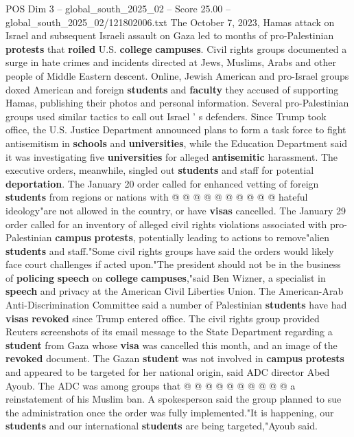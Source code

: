 \begin{textsample}{POS Dim 3 – global\_south\_2025\_02 – Score 25.00 – global\_south\_2025\_02/121802006.txt}
The October 7, 2023, Hamas attack on Israel and subsequent Israeli assault on Gaza led to months of pro-Palestinian \textbf{protests} that \textbf{roiled} U.S. \textbf{college} \textbf{campuses}.
Civil rights groups documented a surge in hate crimes and incidents directed at Jews, Muslims, Arabs and other people of Middle Eastern descent.
Online, Jewish American and pro-Israel groups doxed American and foreign \textbf{students} and \textbf{faculty} they accused of supporting Hamas, publishing their photos and personal information.
Several pro-Palestinian groups used similar tactics to call out Israel ' s defenders.
Since Trump took office, the U.S.
Justice Department announced plans to form a task force to fight antisemitism in \textbf{schools} and \textbf{universities}, while the Education Department said it was investigating five \textbf{universities} for alleged \textbf{antisemitic} harassment.
The executive orders, meanwhile, singled out \textbf{students} and staff for potential \textbf{deportation}.
The January 20 order called for enhanced vetting of foreign \textbf{students} from regions or nations with @ @ @ @ @ @ @ @ @ @ hateful ideology"are not allowed in the country, or have \textbf{visas} cancelled.
The January 29 order called for an inventory of alleged civil rights violations associated with pro-Palestinian \textbf{campus} \textbf{protests}, potentially leading to actions to remove"alien \textbf{students} and staff."Some civil rights groups have said the orders would likely face court challenges if acted upon."The president should not be in the business of \textbf{policing} \textbf{speech} on \textbf{college} \textbf{campuses},"said Ben Wizner, a specialist in \textbf{speech} and privacy at the American Civil Liberties Union.
The American-Arab Anti-Discrimination Committee said a number of Palestinian \textbf{students} have had \textbf{visas} \textbf{revoked} since Trump entered office.
The civil rights group provided Reuters screenshots of its email message to the State Department regarding a \textbf{student} from Gaza whose \textbf{visa} was cancelled this month, and an image of the \textbf{revoked} document.
The Gazan \textbf{student} was not involved in \textbf{campus} \textbf{protests} and appeared to be targeted for her national origin, said ADC director Abed Ayoub.
The ADC was among groups that @ @ @ @ @ @ @ @ @ @ a reinstatement of his Muslim ban.
A spokesperson said the group planned to sue the administration once the order was fully implemented."It is happening, our \textbf{students} and our international \textbf{students} are being targeted,"Ayoub said.

\end{textsample}
